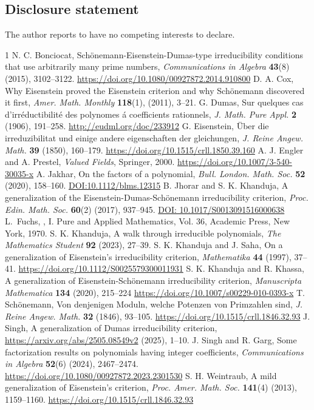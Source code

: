 \documentclass[12pt]{amsart}%
\begin{document}
\subsection*{Disclosure statement}
The author reports to have no competing interests to declare.
\begin{thebibliography}{1}
 N. C. Bonciocat, Sch\"onemann-Eisenstein-Dumas-type irreducibility conditions that use arbitrarily many prime numbers, \emph{Communications in  Algebra} \textbf{43}(8) (2015), 3102--3122. \url{https://doi.org/10.1080/00927872.2014.910800}
 D. A. Cox, Why Eisenstein proved the Eisenstein criterion
and why Sch\"onemann discovered it first, \emph{Amer. Math. Monthly}  {\bf{118}}(1), (2011), 3--21.
 G. Dumas, Sur quelques cas d'irr\'eductibilit\'e des polynomes \'a coefficients rationnels, \emph{J. Math. Pure Appl.} \textbf{2} (1906), 191--258. \url{http://eudml.org/doc/233912}
 G. Eisenstein, \"Uber die irreduzibilitat und einige andere eigenschaften der gleichungen, \emph{J. Reine Angew. Math.} {\bf 39} (1850), 160--179. \url{https://doi.org/10.1515/crll.1850.39.160}
 A. J. Engler and A. Prestel, \emph{Valued Fields},  Springer, 2000. \url{https://doi.org/10.1007/3-540-30035-x}
 A. Jakhar, On the factors of a polynomial, \emph{Bull. London. Math. Soc.} \textbf{52} (2020), 158--160. \url{DOI:10.1112/blms.12315}
 B. Jhorar and S. K. Khanduja, A generalization of the Eisenstein-Dumas-Sch\"onemann irreducibility criterion, \emph{Proc. Edin. Math. Soc.} \textbf{60}(2) (2017), 937--945. \url{DOI: 10.1017/S0013091516000638}
L.~Fuchs, , I. Pure and Applied Mathematics, Vol. 36,
\newblock Academic Press, New York, 1970.    
 S. K. Khanduja, A walk through irreducible polynomials, \emph{The Mathematics Student} \textbf{92} (2023), 27--39.
 S. K. Khanduja and J. Saha, On a generalization of Eisenstein's irreducibility criterion, \emph{Mathematika} \textbf{44} (1997), 37--41. \url{https://doi.org/10.1112/S0025579300011931}
 S. K. Khanduja and R. Khassa, A generalization of Eisenstein-Sch\"onemann
irreducibility criterion, \emph{Manuscripta Mathematica} \textbf{134} (2020), 215--224 \url{https://doi.org/10.1007/s00229-010-0393-x}
 T. Sch\"onemann, Von denjenigen Moduln, welche Potenzen von Primzahlen sind, \emph{J. Reine Angew. Math.} {\bf 32} (1846), 93--105. \url{https://doi.org/10.1515/crll.1846.32.93}
 J. Singh, A generalization of Dumas irreducibility criterion, \url{https://arxiv.org/abs/2505.08549v2} (2025), 1--10.
 J. Singh and R. Garg, Some factorization results on polynomials having integer coefficients, \emph{Communications in  Algebra} {\bf 52}(6) (2024), 2467--2474. \url{https://doi.org/10.1080/00927872.2023.2301530}
 S. H. Weintraub, A mild generalization of Eisenstein's criterion, \emph{Proc. Amer. Math. Soc.} {\bf 141}(4) (2013), 1159--1160. \url{https://doi.org/10.1515/crll.1846.32.93} 
\end{thebibliography}
\end{document}
